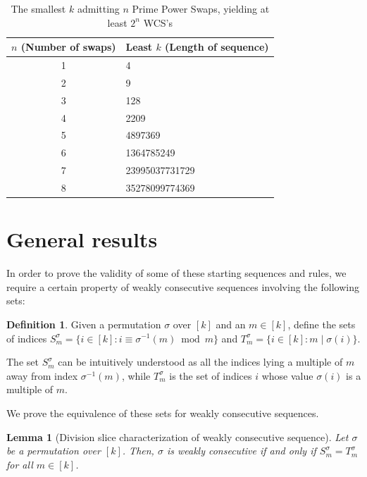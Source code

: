 \documentclass{article}
\newtheorem{lemma}[theorem]{Lemma}
\theoremstyle{definition}
\newtheorem{definition}[theorem]{Definition}
\theoremstyle{remark}
\numberwithin{equation}{section}
\numberwithin{case}{theorem}
\begin{document}
\begin{table}
\centering
\begin{tabular}{c|l}
    $n$ (Number of swaps) & Least $k$ (Length of sequence) \\ 
    \hline
    1 & 4 \\
    2 & 9 \\
    3 & 128 \\
    4 & 2209 \\
    5 & 4897369 \\
    6 & 1364785249 \\
    7 & 23995037731729 \\
    8 & 35278099774369 \\
\end{tabular}
\caption{The smallest $k$ admitting $n$ Prime Power Swaps, yielding at least $2^n$ WCS's}
\label{tab:PPS}
\end{table}


\section{General results}

In order to prove the validity of some of these starting sequences and rules, we require a certain property of weakly consecutive sequences involving the following sets:

\begin{definition}\label{def:characterization}
    Given a permutation $\sigma$ over $[k]$ and an $m \in [k]$, define the sets of indices $S_m^\sigma = \{ i \in [k] : i \equiv \sigma^{-1}(m) \bmod m \}$ and $T_m^\sigma = \{ i \in [k] : m \mid \sigma(i) \}$.
\end{definition}

The set $S_m^\sigma$ can be intuitively understood as all the indices lying a multiple of $m$ away from index $\sigma^{-1}(m)$, while $T_m^\sigma$ is the set of indices $i$ whose value $\sigma(i)$ is a multiple of $m$.

We prove the equivalence of these sets for weakly consecutive sequences.

\begin{lemma}[Division slice characterization of weakly consecutive sequence]\label{lem:characterization}
     Let $\sigma$ be a permutation over $[k]$. Then, $\sigma$ is weakly consecutive if and only if $S_m^\sigma = T_m^\sigma$ for all $m \in [k]$.
\end{lemma}
\end{document}
